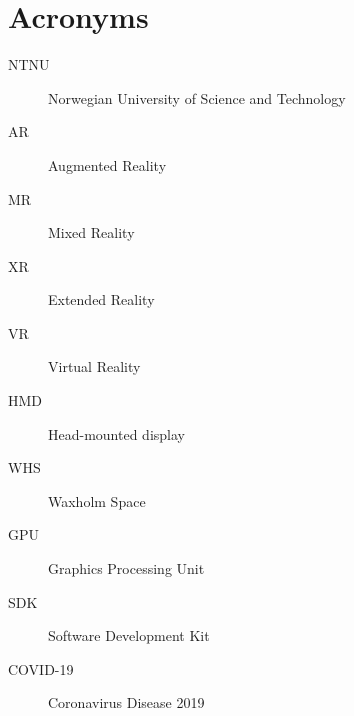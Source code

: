 
\chapter{Acronyms}
\begin{description}
\item[NTNU] Norwegian University of Science and Technology
\item[AR] Augmented Reality
\item[MR] Mixed Reality
\item[XR] Extended Reality
\item[VR] Virtual Reality
\item[HMD] Head-mounted display
\item[WHS] Waxholm Space
\item[GPU] Graphics Processing Unit
\item[SDK] Software Development Kit
\item[COVID-19] Coronavirus Disease 2019
\end{description}